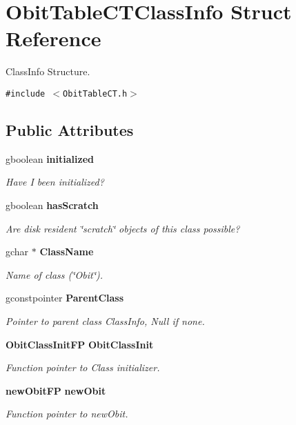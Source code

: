 \section{Obit\-Table\-CTClass\-Info Struct Reference}
\label{structObitTableCTClassInfo}
Class\-Info Structure.  


{\tt \#include $<$Obit\-Table\-CT.h$>$}

\subsection*{Public Attributes}
\begin{CompactItemize}
\item 
gboolean {\bf initialized}
\begin{CompactList}\small\item\em Have I been initialized? \item\end{CompactList}\item 
gboolean {\bf has\-Scratch}
\begin{CompactList}\small\item\em Are disk resident \char`\"{}scratch\char`\"{} objects of this class possible? \item\end{CompactList}\item 
gchar $\ast$ {\bf Class\-Name}
\begin{CompactList}\small\item\em Name of class (\char`\"{}Obit\char`\"{}). \item\end{CompactList}\item 
gconstpointer {\bf Parent\-Class}
\begin{CompactList}\small\item\em Pointer to parent class Class\-Info, Null if none. \item\end{CompactList}\item 
{\bf Obit\-Class\-Init\-FP} {\bf Obit\-Class\-Init}
\begin{CompactList}\small\item\em Function pointer to Class initializer. \item\end{CompactList}\item 
{\bf new\-Obit\-FP} {\bf new\-Obit}
\begin{CompactList}\small\item\em Function pointer to new\-Obit. \item\end{CompactList}\item 

\end{CompactItemize}
